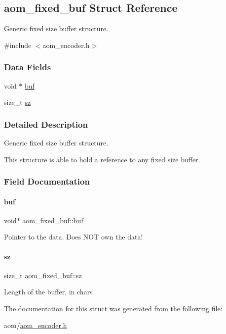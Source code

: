 \hypertarget{structaom__fixed__buf}{}\subsection{aom\+\_\+fixed\+\_\+buf Struct Reference}
\label{structaom__fixed__buf}


Generic fixed size buffer structure.  




{\ttfamily \#include $<$aom\+\_\+encoder.\+h$>$}

\subsubsection*{Data Fields}
\begin{DoxyCompactItemize}
\item 
void $\ast$ \hyperlink{structaom__fixed__buf_ac1b22da152c9839329d3780208dffd38}{buf}
\item 
size\+\_\+t \hyperlink{structaom__fixed__buf_a02f47e8b960c332c60a8aa4b7e37426f}{sz}
\end{DoxyCompactItemize}


\subsubsection{Detailed Description}
Generic fixed size buffer structure. 

This structure is able to hold a reference to any fixed size buffer. 

\subsubsection{Field Documentation}
\mbox{\label{structaom__fixed__buf_ac1b22da152c9839329d3780208dffd38}} 
\paragraph{\texorpdfstring{buf}{buf}}
{\footnotesize\ttfamily void$\ast$ aom\+\_\+fixed\+\_\+buf\+::buf}

Pointer to the data. Does N\+OT own the data! \mbox{\label{structaom__fixed__buf_a02f47e8b960c332c60a8aa4b7e37426f}} 
\paragraph{\texorpdfstring{sz}{sz}}
{\footnotesize\ttfamily size\+\_\+t aom\+\_\+fixed\+\_\+buf\+::sz}

Length of the buffer, in chars 

The documentation for this struct was generated from the following file\+:\begin{DoxyCompactItemize}
\item 
aom/\hyperlink{aom__encoder_8h}{aom\+\_\+encoder.\+h}\end{DoxyCompactItemize}
